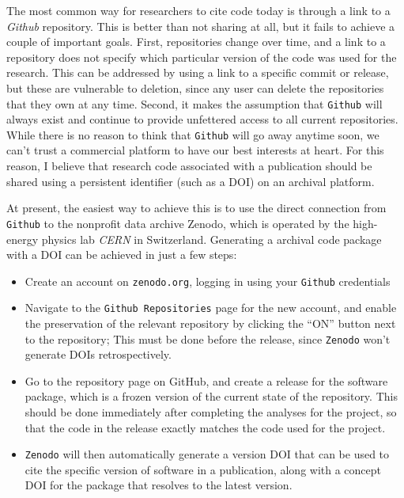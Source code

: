The most common way for researchers to cite code today is through a link to a \textit{Github} repository.  This is better than not sharing at all, but it fails to achieve a couple of important goals.  First, repositories change over time, and a link to a repository does not specify which particular version of the code was used for the research.  This can be addressed by using a link to a specific commit or release, but these are vulnerable to deletion, since any user can delete the repositories that they own at any time.  Second, it makes the assumption that \texttt{Github} will always exist and continue to provide unfettered access to all current repositories.  While there is no reason to think that \texttt{Github} will go away anytime soon, we can't trust a commercial platform to have our best interests at heart.  For this reason, I believe that research code associated with a publication should be shared using a persistent identifier (such as a DOI) on an archival platform.

At present, the easiest way to achieve this is to use the direct connection from \texttt{Github} to the nonprofit data archive Zenodo, which is operated by the high-energy physics lab \textit{CERN} in Switzerland. Generating a archival code package with a DOI can be achieved in just a few steps:

\begin{itemize}
\item Create an account on \texttt{zenodo.org}, logging in using your \texttt{Github} credentials
\item Navigate to the \texttt{Github Repositories} page for the new account, and enable the preservation of the relevant repository by clicking the ``ON'' button next to the repository; This must be done before the release, since \texttt{Zenodo} won't generate DOIs retrospectively.
\item Go to the repository page on GitHub, and create a release for the software package, which is a frozen version of the current state of the repository.  This should be done immediately after completing the analyses for the project, so that the code in the release exactly matches the code used for the project.
\item \texttt{Zenodo} will then automatically generate a version DOI that can be used to cite the specific version of software in a publication, along with a concept DOI for the package that resolves to the latest version.
\end{itemize}

